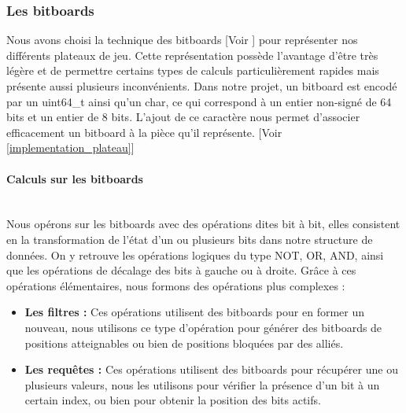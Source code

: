 \documentclass{article}
\begin{document}
\subsubsection{Les bitboards}
Nous avons choisi la technique des bitboards [Voir \cite{Bitboards}] pour représenter nos différents plateaux de jeu.
Cette représentation possède l'avantage d'être très légère et de permettre certains types de calculs particulièrement rapides mais présente aussi plusieurs inconvénients.
Dans notre projet, un bitboard est encodé par un uint64\_t ainsi qu'un char, ce qui correspond à un entier non-signé de 64 bits et un entier de 8 bits.
L'ajout de ce caractère nous permet d'associer efficacement un bitboard à la pièce qu'il représente. [Voir \ref{implementation_plateau}]
\paragraph{Calculs sur les bitboards} \label{calculs_sur_les_bitboards}
~~\\
Nous opérons sur les bitboards avec des opérations dites bit à bit, elles consistent en la transformation de l'état d'un ou plusieurs bits dans notre structure de données.
On y retrouve les opérations logiques du type NOT, OR, AND, ainsi que les opérations de décalage des bits à gauche ou à droite.
Grâce à ces opérations élémentaires, nous formons des opérations plus complexes :
\begin{itemize}
    \item \textbf{Les filtres : }
    Ces opérations utilisent des bitboards pour en former un nouveau, nous utilisons ce type d'opération pour générer des bitboards de positions atteignables ou bien de positions bloquées par des alliés. 
    \item \textbf{Les requêtes : }
    Ces opérations utilisent des bitboards pour récupérer une ou plusieurs valeurs, nous les utilisons pour vérifier la présence d'un bit à un certain index, ou bien pour obtenir la position des bits actifs.
\end{itemize}
\end{document}
